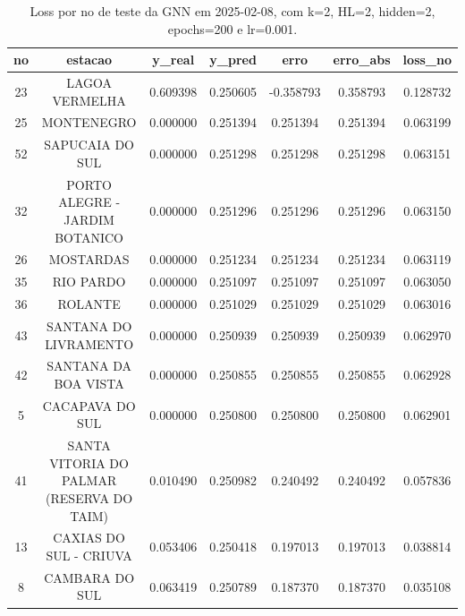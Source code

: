 \begin{table}[h]
\centering
\caption{Loss por no de teste da GNN em 2025-02-08, com k=2, HL=2, hidden=2, epochs=200 e lr=0.001.}
\label{tab:gnn_loss_k2_hl2_h2_e200_d20250208}
\begin{tabular}{ccccccc}
\toprule
no & estacao & y\_real & y\_pred & erro & erro\_abs & loss\_no \\
\midrule
23 & LAGOA VERMELHA & 0.609398 & 0.250605 & -0.358793 & 0.358793 & 0.128732 \\
25 & MONTENEGRO & 0.000000 & 0.251394 & 0.251394 & 0.251394 & 0.063199 \\
52 & SAPUCAIA DO SUL & 0.000000 & 0.251298 & 0.251298 & 0.251298 & 0.063151 \\
32 & PORTO ALEGRE - JARDIM BOTANICO & 0.000000 & 0.251296 & 0.251296 & 0.251296 & 0.063150 \\
26 & MOSTARDAS & 0.000000 & 0.251234 & 0.251234 & 0.251234 & 0.063119 \\
35 & RIO PARDO & 0.000000 & 0.251097 & 0.251097 & 0.251097 & 0.063050 \\
36 & ROLANTE & 0.000000 & 0.251029 & 0.251029 & 0.251029 & 0.063016 \\
43 & SANTANA DO LIVRAMENTO & 0.000000 & 0.250939 & 0.250939 & 0.250939 & 0.062970 \\
42 & SANTANA DA BOA VISTA & 0.000000 & 0.250855 & 0.250855 & 0.250855 & 0.062928 \\
5 & CACAPAVA DO SUL & 0.000000 & 0.250800 & 0.250800 & 0.250800 & 0.062901 \\
41 & SANTA VITORIA DO PALMAR (RESERVA DO TAIM) & 0.010490 & 0.250982 & 0.240492 & 0.240492 & 0.057836 \\
13 & CAXIAS DO SUL - CRIUVA & 0.053406 & 0.250418 & 0.197013 & 0.197013 & 0.038814 \\
8 & CAMBARA DO SUL & 0.063419 & 0.250789 & 0.187370 & 0.187370 & 0.035108 \\
\bottomrule
\end{tabular}
\end{table}
